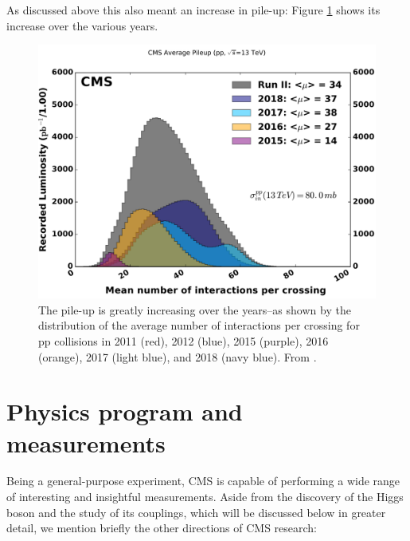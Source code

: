 As discussed above this also meant an increase in pile-up: Figure \ref{fig:pileup} shows its increase over the various years.

\begin{figure}
    \centering
     \includegraphics[width=\columnwidth]{gfx/ch1/pileup_allYears_run2.pdf}
    \caption[Pile-up]{The pile-up is greatly increasing over the years--as shown by the distribution of the average number of interactions per crossing for pp collisions in 2011 (red), 2012 (blue), 2015 (purple), 2016 (orange), 2017 (light blue), and 2018 (navy blue). From \cite{cmspubliclumi}.}
    \label{fig:pileup}
\end{figure}

\section{Physics program and measurements}

Being a general-purpose experiment, CMS is capable of performing a wide range of interesting and insightful measurements. Aside from the discovery of the Higgs boson and the study of its couplings, which will be discussed below in greater detail, we mention briefly the other directions of CMS research:

